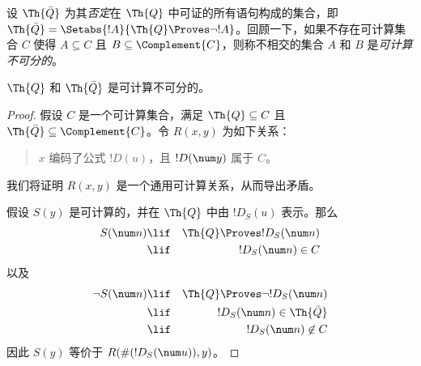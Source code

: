 \documentclass[../../../include/open-logic-section]{subfiles}
\begin{document}


设 $\Th{\bar Q}$ 为其{\em 否定}在 $\Th{Q}$ 中可证的所有语句构成的集合，即 $\Th{\bar Q} = \Setabs{!A}{\Th{Q} \Proves
  \lnot !A}$。回顾一下，如果不存在可计算集合 $C$ 使得 $A \subseteq C$ 且 $B \subseteq \Complement{C}$，则称不相交的集合 $A$ 和 $B$ 是{\em 可计算不可分的}。

\begin{lem}
$\Th{Q}$ 和 $\Th{\bar Q}$ 是可计算不可分的。
\end{lem}

\begin{proof}
假设 $C$ 是一个可计算集合，满足 $\Th{Q} \subseteq C$ 且 $\Th{\bar Q} \subseteq \Complement{C}$。令 $R(x,y)$ 为如下关系：
\begin{quote}
$x$ 编码了公式 $!D(u)$，且 $!D(\num y)$ 属于 $C$。
\end{quote}
我们将证明 $R(x,y)$ 是一个通用可计算关系，从而导出矛盾。

假设 $S(y)$ 是可计算的，并在 $\Th{Q}$ 中由 $!D_S(u)$ 表示。那么
\begin{eqnarray*}
S(\num n) & \lif & \Th{Q} \Proves !D_S(\num n) \\
& \lif & !D_S(\num n) \in C
\end{eqnarray*}
以及
\begin{eqnarray*}
\lnot S(\num n) & \lif & \Th{Q} \Proves \lnot !D_S(\num n) \\
& \lif & !D_S(\num n) \in \Th{\bar Q} \\
& \lif & !D_S(\num n) \not\in C
\end{eqnarray*}
因此 $S(y)$ 等价于 $R(\#(!D_S(\num u)),y)$。
\end{proof}
\end{document}
